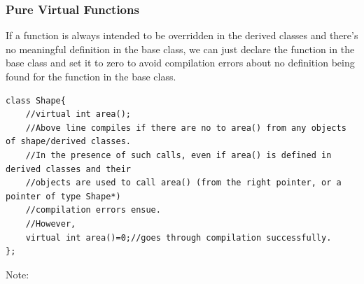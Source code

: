 \documentclass{report}
\begin{document}
\subsubsection{Pure Virtual Functions}
If a function is always intended to be overridden in the derived classes and there's no meaningful definition in the base class,
we can just declare the function in the base class and set it to zero to avoid compilation errors about no definition being found for
the function in the base class.
\begin{lstlisting}
class Shape{
    //virtual int area();
    //Above line compiles if there are no to area() from any objects of shape/derived classes.
    //In the presence of such calls, even if area() is defined in derived classes and their
    //objects are used to call area() (from the right pointer, or a pointer of type Shape*)
    //compilation errors ensue.
    //However,
    virtual int area()=0;//goes through compilation successfully.
};
\end{lstlisting}
Note:
\end{document}
